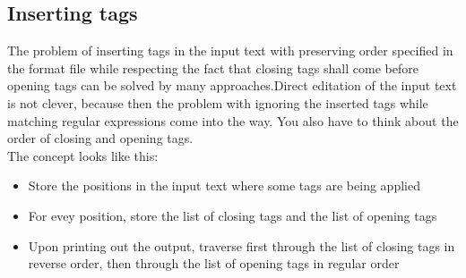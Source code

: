 \documentclass[12pt,a4paper,final]{article}
\begin{document}
\subsection{Inserting tags}
The problem of inserting tags in the input text with preserving order specified in the format file while respecting the fact that closing tags shall come before opening tags can be solved by many approaches.Direct editation of the input text is not clever, because then the problem with ignoring the inserted tags while matching regular expressions come into the way. You also have to think about the order of closing and opening tags. \\
\newline
The concept looks like this:
\begin{itemize}
\item Store the positions in the input text where some tags are being applied
\item For evey position, store the list of closing tags and the list of opening tags
\item Upon printing out the output, traverse first through the list of closing tags in reverse order, then through the list of opening tags in regular order
\end{itemize}
\end{document}
